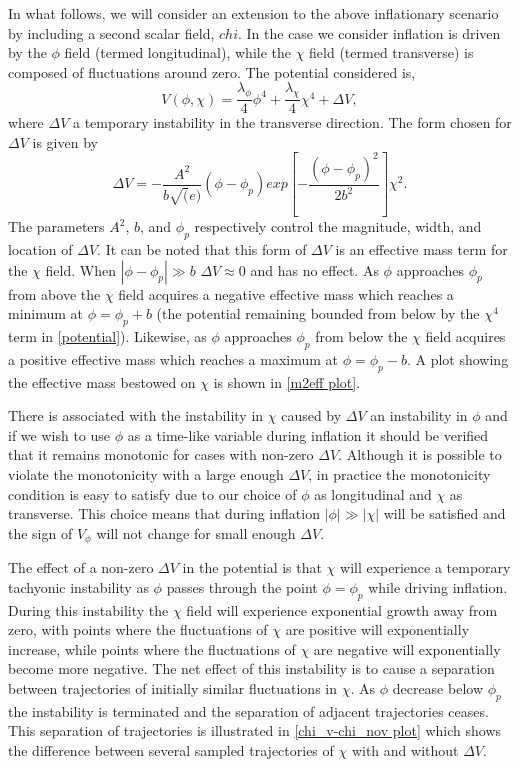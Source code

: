 \documentclass[letterpaper,11pt]{article}
\begin{document}
In what follows, we will consider an extension to the above inflationary scenario by including a second scalar field, $chi$. In the case we consider inflation is driven by the $\phi$ field (termed longitudinal), while the  $\chi$ field (termed transverse) is composed of fluctuations around zero. The potential considered is,
\begin{equation}
V(\phi, \chi) = \frac{\lambda_{\phi}}{4}\phi^4 + \frac{\lambda_{\chi}}{4}\chi^4 + \Delta V, \label{potential}
\end{equation}
where $\Delta V$ a temporary instability in the transverse direction. The form chosen for $\Delta V$ is given by
\begin{equation}
\Delta V = -\frac{A^2}{b\sqrt(e)}(\phi - \phi_p)exp[-\frac{(\phi-\phi_p)^2}{2b^2}]\chi^2.
\end{equation}
The parameters $A^2$, $b$, and $\phi_p$ respectively control the magnitude, width, and location of $\Delta V$. It can be noted that this form of $\Delta V$ is an effective mass term for the $\chi$ field. When $|\phi-\phi_p| \gg b$ $\Delta V \approx 0$ and has no effect. As $\phi$ approaches $\phi_p$ from above the $\chi$ field acquires a negative effective mass which reaches a minimum at $\phi = \phi_p + b$ (the potential remaining bounded from below by the $\chi^4$ term in \ref{potential}). Likewise, as $\phi$ approaches $\phi_p$ from below the $\chi$ field acquires a positive effective mass which reaches a maximum at $\phi = \phi_p - b$. A plot showing the effective mass bestowed on $\chi$ is shown in \ref{m2eff plot}. 

There is associated with the instability in $\chi$ caused by $\Delta V$ an instability in $\phi$ and if we wish to use $\phi$ as a time-like variable during inflation it should be verified that it remains monotonic for cases with non-zero $\Delta V$. Although it is possible to violate the monotonicity with a large enough $\Delta V$, in practice the monotonicity condition is easy to satisfy due to our choice of $\phi$ as longitudinal and $\chi$ as transverse. This choice means that during inflation $|\phi| \gg |\chi|$ will be satisfied and the sign of $V_{\phi}$ will not change for small enough $\Delta V$.

The effect of a non-zero $\Delta V$ in the potential is that $\chi$ will experience a temporary tachyonic instability as $\phi$ passes through the point $\phi=\phi_p$ while driving inflation. During this instability the $\chi$ field will experience exponential growth away from zero, with points where the fluctuations of $\chi$ are positive will exponentially increase, while points where the fluctuations of $\chi$ are negative will exponentially become more negative. The net effect of this instability is to cause a separation between trajectories of initially similar fluctuations in $\chi$. As $\phi$ decrease below $\phi_p$ the instability is terminated and the separation of adjacent trajectories ceases. This separation of trajectories is illustrated in \ref{chi_v-chi_nov plot} which shows the difference between several sampled trajectories of $\chi$ with and without $\Delta V$.
\end{document}
